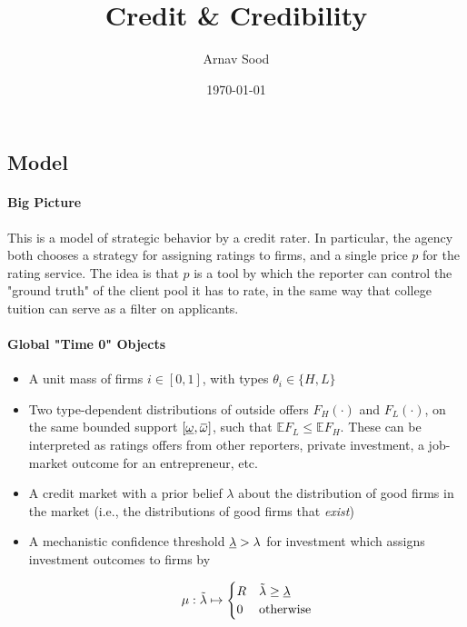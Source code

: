 \documentclass{article}
\author{Arnav Sood}
\title{Credit \& Credibility}
\date{\today}
\newcommand{\overbar}[1]{\mkern 1.5mu\overline{\mkern-1.5mu#1\mkern-1.5mu}\mkern 1.5mu}
\begin{document}
\maketitle

\subsection*{Model}

\paragraph{Big Picture} This is a model of strategic behavior by a credit rater. In particular, the agency both chooses a strategy for assigning ratings to firms, and a single price $p$ for the rating service. The idea is that $p$ is a tool by which the reporter can control the "ground truth" of the client pool it has to rate, in the same way that college tuition can serve as a filter on applicants. 

\paragraph{Global "Time 0" Objects}

\begin{itemize}
    \item A unit mass of firms $i \in [0, 1]$, with types $\theta_i \in \{H, L\}$ 
    \item Two type-dependent distributions of outside offers $F_H(\cdot)$ and $F_L(\cdot)$, on the same bounded support $[\uline{\omega}, \overbar{\omega}]$, such that $\mathbb{E}F_L \leq \mathbb{E}F_H$. These can be interpreted as ratings offers from other reporters, private investment, a job-market outcome for an entrepreneur, etc. 
    \item A credit market with a prior belief $\lambda$ about the distribution of good firms in the market (i.e., the distributions of good firms that \emph{exist})
    \item A mechanistic confidence threshold $\uline{\lambda} > \lambda$ for investment which assigns investment outcomes to firms by 
    
    \begin{equation}
        \mu: \tilde{\lambda} \mapsto 
        \begin{cases}
            R & \tilde{\lambda} \geq \uline{\lambda} \\ 
            0 & \textup{otherwise}
        \end{cases}
    \end{equation}
\end{itemize}
\end{document}
